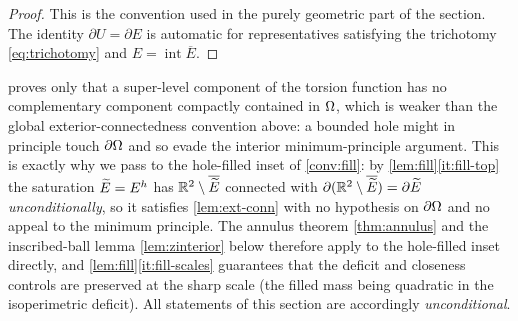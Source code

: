 \begin{proof}
This is the convention used in the purely geometric part of the section.  The
identity $\partial U=\partial E$ is automatic for representatives satisfying
the trichotomy \eqref{eq:trichotomy} and $E=\operatorname{int}\overline E$.
\end{proof}

\begin{remark}
\label{rem:noholes-resolved}
 proves only that a super-level component of the torsion
function has no complementary component compactly contained in $\Omega$, which is
weaker than the global exterior-connectedness convention above: a bounded hole
might in principle touch $\partial\Omega$ and so evade the interior
minimum-principle argument. This is exactly why we pass to the hole-filled
inset of \cref{conv:fill}: by \cref{lem:fill}\ref{it:fill-top} the saturation
$\widetilde{E}=E^h$ has $\mathbb{R}^2\setminus\overline{\widetilde{E}}$ connected with
$\partial(\mathbb{R}^2\setminus\overline{\widetilde{E}})=\partial\widetilde{E}$ \emph{unconditionally},
so it satisfies \cref{lem:ext-conn} with no hypothesis on $\partial\Omega$ and no
appeal to the minimum principle. The annulus theorem \cref{thm:annulus} and
the inscribed-ball lemma \cref{lem:zinterior} below therefore apply to the
hole-filled inset directly, and \cref{lem:fill}\ref{it:fill-scales} guarantees
that the deficit and closeness controls are preserved at the sharp scale (the
filled mass being quadratic in the isoperimetric deficit). All statements of
this section are accordingly \emph{unconditional}.
\end{remark}

